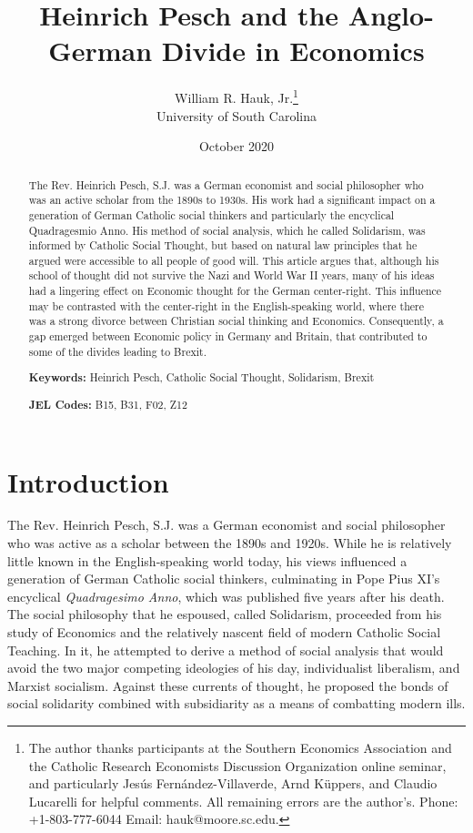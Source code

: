 \documentclass{article}
\title{Heinrich Pesch and the Anglo-German Divide in Economics}
\author{William R. Hauk, Jr.\thanks{The author thanks participants at the Southern Economics Association and the Catholic Research Economists Discussion Organization online seminar, and particularly Jes\'{u}s Fern\'{a}ndez-Villaverde, Arnd K\"{u}ppers, and Claudio Lucarelli for helpful comments.  All remaining errors are the author's.  Phone:  +1-803-777-6044  Email:  hauk@moore.sc.edu.}\\University of South Carolina}
\date{October 2020}
\begin{document}
\maketitle

\doublespacing
\begin{abstract}
The Rev. Heinrich Pesch, S.J. was a German economist and social philosopher who was an active scholar from the 1890s to 1930s.  His work had a significant impact on a generation of German Catholic social thinkers and particularly the encyclical Quadragesmio Anno.  His method of social analysis, which he called Solidarism, was informed by Catholic Social Thought, but based on natural law principles that he argued were accessible to all people of good will.  This article argues that, although his school of thought did not survive the Nazi and World War II years, many of his ideas had a lingering effect on Economic thought for the German center-right.  This influence may be contrasted with the center-right in the English-speaking world, where there was a strong divorce between Christian social thinking and Economics.  Consequently, a gap emerged between Economic policy in Germany and Britain, that contributed to some of the divides leading to Brexit.

\textbf{Keywords:}  Heinrich Pesch, Catholic Social Thought, Solidarism, Brexit

\textbf{JEL Codes:}  B15, B31, F02, Z12

\end{abstract}

\section{Introduction}

The Rev. Heinrich Pesch, S.J. was a German economist and social philosopher who was active as a scholar between the 1890s and 1920s.  While he is relatively little known in the English-speaking world today, his views influenced a generation of German Catholic social thinkers, culminating in Pope Pius XI’s encyclical \emph{Quadragesimo Anno}, which was published five years after his death.  The social philosophy that he espoused, called Solidarism, proceeded from his study of Economics and the relatively nascent field of modern Catholic Social Teaching.  In it, he attempted to derive a method of social analysis that would avoid the two major competing ideologies of his day, individualist liberalism, and Marxist socialism.  Against these currents of thought, he proposed the bonds of social solidarity combined with subsidiarity as a means of combatting modern ills.\medskip
\end{document}
